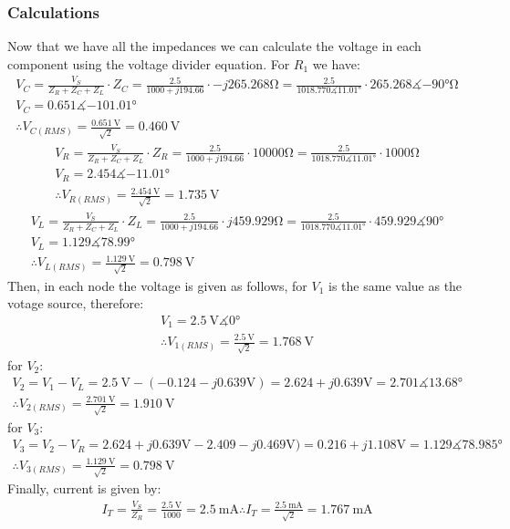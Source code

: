 \documentclass[letterpaper]{article}
\begin{document}
\subsubsection{Calculations}
Now that we have all the impedances we can calculate the voltage in each component
using the voltage divider equation. For $R_1$ we have:
\begin{gather*}
    V_{C} = \frac{V_S}{Z_R+Z_C+Z_L}\cdot Z_C = \frac{2.5}{1000+j194.66}\cdot -j265.268\si{\ohm} =
    \frac{2.5}{1018.770\measuredangle\ang{11.01}}\cdot 265.268\measuredangle\ang{-90}\si{\ohm}\\
    V_{C} = 0.651\measuredangle\ang{-101.01}\\
    \therefore V_{C(RMS)} = \frac{\SI{0.651}{\volt}}{\sqrt{2}} = \SI{0.460}{\volt}
\end{gather*}
\begin{gather*}
    V_{R} = \frac{V_S}{Z_R+Z_C+Z_L}\cdot Z_R = \frac{2.5}{1000+j194.66}\cdot 10000\si{\ohm} =
    \frac{2.5}{1018.770\measuredangle\ang{11.01}}\cdot 1000\si{\ohm}\\
    V_{R} = 2.454\measuredangle\ang{-11.01}\\
    \therefore V_{R(RMS)} = \frac{\SI{2.454}{\volt}}{\sqrt{2}} = \SI{1.735}{\volt}
\end{gather*}
\begin{gather*}
    V_{L} = \frac{V_S}{Z_R+Z_C+Z_L}\cdot Z_L = \frac{2.5}{1000+j194.66}\cdot j459.929\si{\ohm} =
    \frac{2.5}{1018.770\measuredangle\ang{11.01}}\cdot 459.929\measuredangle\ang{90}\\
    V_{L} = 1.129\measuredangle\ang{78.99}\\
    \therefore V_{L(RMS)} = \frac{\SI{1.129}{\volt}}{\sqrt{2}} = \SI{0.798}{\volt}
\end{gather*}
Then, in each node the voltage is given as follows, for $V_1$ is the same value as the votage
source, therefore:
\begin{gather*}
    V_1 = \SI{2.5}{\volt}\measuredangle\ang{0}\\
    \therefore V_{1(RMS)} = \frac{\SI{2.5}{\volt}}{\sqrt{2}} = \SI{1.768}{\volt}
\end{gather*}
for $V_2$:
\begin{gather*}
    V_2 = V_1 - V_L = \SI{2.5}{\volt}-(-0.124-j0.639\si{\volt}) = 2.624+j0.639\si{\volt} =
    2.701\measuredangle\ang{13.68}\\
    \therefore V_{2(RMS)} = \frac{\SI{2.701}{\volt}}{\sqrt{2}} = \SI{1.910}{\volt}
\end{gather*}
for $V_3$:
\begin{gather*}
    V_3 = V_2 - V_R = 2.624+j0.639\si{\volt}-2.409-j0.469\si{\volt}) = 0.216+j1.108\si{\volt} =
    1.129\measuredangle\ang{78.985}\\
    \therefore V_{3(RMS)} = \frac{\SI{1.129}{\volt}}{\sqrt{2}} = \SI{0.798}{\volt}
\end{gather*}
Finally, current is given by:
\begin{gather*}
    I_T = \frac{V_S}{Z_R} = \frac{\SI{2.5}{\volt}}{1000} = \SI{2.5}{\milli\ampere}
    \therefore I_T = \frac{\SI{2.5}{\milli\ampere}}{\sqrt{2}} = \SI{1.767}{\milli\ampere}
\end{gather*}
\end{document}
